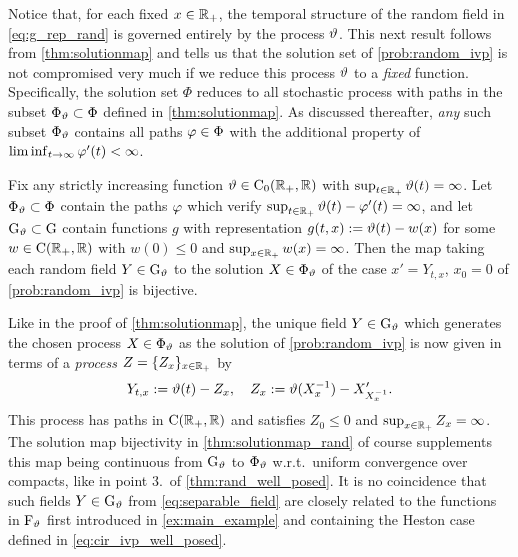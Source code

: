 Notice that, for each fixed $x\in\mathbb{R}_+$, the temporal structure of the random field in \autoref{eq:g_rep_rand} is governed entirely by the process $\vartheta$. This next result follows from \autoref{thm:solutionmap} and tells us that the solution set of \autoref{prob:random_ivp} is not compromised very much if we reduce this process $\vartheta$ to a \emph{fixed} function. Specifically, the solution set $\Phi$ reduces to all stochastic process with paths in the subset $\Phi_\vartheta\subset\Phi$ defined in \autoref{thm:solutionmap}. As discussed thereafter, \emph{any} such subset $\Phi_\vartheta$ contains all paths $\varphi\in\Phi$ with the additional property of $\liminf_{t\to\infty}\varphi'(t)<\infty$.

\begin{corollary}\label{thm:solutionmap_rand}
    Fix any strictly increasing function $\vartheta\in\mathrm{C}_0(\mathbb{R}_+,\mathbb{R})$ with $\sup_{t\in\mathbb{R}_+}\vartheta(t)=\infty$. Let $\Phi_\vartheta\subset\Phi$ contain the paths $\varphi$ which verify $\sup_{t\in\mathbb{R}_+}\vartheta(t)-\varphi'(t)=\infty$, and let $\mathrm{G}_\vartheta\subset\mathrm{G}$ contain functions $g$ with representation $g(t,x):=\vartheta(t)-w(x)$ for some $w\in\mathrm{C}(\mathbb{R}_+,\mathbb{R})$ with $w(0)\le0$ and $\sup_{x\in\mathbb{R}_+}w(x)=\infty$. Then the map taking each random field $Y\in\mathrm{G}_\vartheta$ to the solution $X\in\Phi_\vartheta$ of the case $x' = Y_{t,x}$, $x_0=0$ of \autoref{prob:random_ivp} is bijective.
\end{corollary}

Like in the proof of \autoref{thm:solutionmap}, the unique field $Y\in\mathrm{G}_\vartheta$ which generates the chosen process $X\in\Phi_\vartheta$ as the solution of \autoref{prob:random_ivp} is now given in terms of a \emph{process} $Z=\{Z_x\}_{x\in\mathbb{R}_+}$ by
\begin{equation}\label{eq:separable_field}
    Y_{t,x}:=\vartheta(t) - Z_x,\quad Z_x := \vartheta(X^{-1}_x) - X'_{X^{-1}_x}.
\end{equation}
This process has paths in $\mathrm{C}(\mathbb{R}_+,\mathbb{R})$ and satisfies $Z_0\le0$ and $\sup_{x\in\mathbb{R}_+}Z_x=\infty$. The solution map bijectivity in \autoref{thm:solutionmap_rand} of course supplements this map being continuous from $\mathrm{G}_\vartheta$ to $\Phi_\vartheta$ w.r.t.~uniform convergence over compacts, like in point 3.~of \autoref{thm:rand_well_posed}. It is no coincidence that such fields $Y\in\mathrm{G}_\vartheta$ from \autoref{eq:separable_field} are closely related to the functions in $\mathrm{F}_\vartheta$ first introduced in \autoref{ex:main_example} and containing the Heston case defined in \autoref{eq:cir_ivp_well_posed}.

